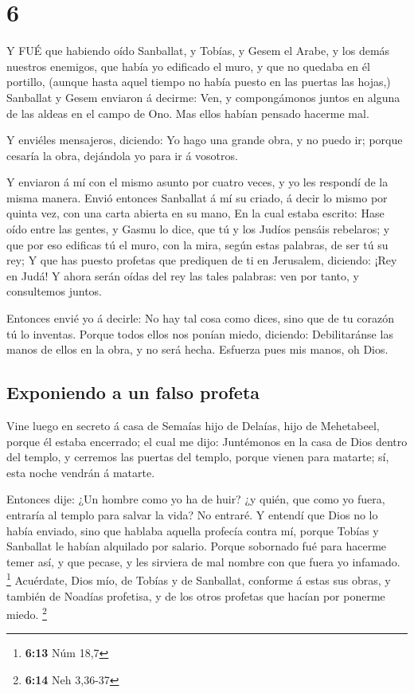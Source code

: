 \hypertarget{section-5}{%
\section{6}\label{section-5}}

 Y FUÉ que habiendo oído Sanballat, y Tobías, y Gesem el
Arabe, y los demás nuestros enemigos, que había yo edificado el muro, y
que no quedaba en él portillo, (aunque hasta aquel tiempo no había
puesto en las puertas las hojas,)  Sanballat y Gesem
enviaron á decirme: Ven, y compongámonos juntos en alguna de las aldeas
en el campo de Ono. Mas ellos habían pensado hacerme mal.

 Y enviéles mensajeros, diciendo: Yo hago una grande obra, y
no puedo ir; porque cesaría la obra, dejándola yo para ir á vosotros.

 Y enviaron á mí con el mismo asunto por cuatro veces, y yo
les respondí de la misma manera.  Envió entonces Sanballat á
mí su criado, á decir lo mismo por quinta vez, con una carta abierta en
su mano,  En la cual estaba escrito: Hase oído entre las
gentes, y Gasmu lo dice, que tú y los Judíos pensáis rebelaros; y que
por eso edificas tú el muro, con la mira, según estas palabras, de ser
tú su rey;  Y que has puesto profetas que prediquen de ti en
Jerusalem, diciendo: ¡Rey en Judá! Y ahora serán oídas del rey las tales
palabras: ven por tanto, y consultemos juntos.

 Entonces envié yo á decirle: No hay tal cosa como dices,
sino que de tu corazón tú lo inventas.  Porque todos ellos
nos ponían miedo, diciendo: Debilitaránse las manos de ellos en la obra,
y no será hecha. Esfuerza pues mis manos, oh Dios.

\hypertarget{exponiendo-a-un-falso-profeta}{%
\subsection{Exponiendo a un falso
profeta}\label{exponiendo-a-un-falso-profeta}}

 Vine luego en secreto á casa de Semaías hijo de Delaías,
hijo de Mehetabeel, porque él estaba encerrado; el cual me dijo:
Juntémonos en la casa de Dios dentro del templo, y cerremos las puertas
del templo, porque vienen para matarte; sí, esta noche vendrán á
matarte.

 Entonces dije: ¿Un hombre como yo ha de huir? ¿y quién,
que como yo fuera, entraría al templo para salvar la vida? No entraré.
 Y entendí que Dios no lo había enviado, sino que hablaba
aquella profecía contra mí, porque Tobías y Sanballat le habían
alquilado por salario.  Porque sobornado fué para hacerme
temer así, y que pecase, y les sirviera de mal nombre con que fuera yo
infamado. \footnote{\textbf{6:13} Núm 18,7}  Acuérdate,
Dios mío, de Tobías y de Sanballat, conforme á estas sus obras, y
también de Noadías profetisa, y de los otros profetas que hacían por
ponerme miedo. \footnote{\textbf{6:14} Neh 3,36-37}

